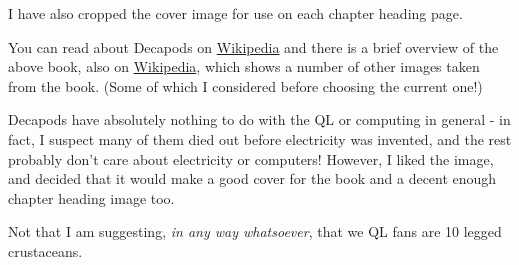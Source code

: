 \documentclass[11pt,fleqn]{book} %
\begin{document}
I have also cropped the cover image for use on each chapter heading page.

You can read about Decapods on \href{https://en.wikipedia.org/wiki/Decapoda}{Wikipedia} and there is a brief overview of the above book, also on \href{https://en.wikipedia.org/wiki/Kunstformen_der_Natur}{Wikipedia},
which shows a number of other images taken from the book. (Some of which I considered before choosing the current one!)

Decapods have absolutely nothing to do with the QL or computing in general - in fact, I suspect many of them died out before electricity was invented, and the rest probably don't care about electricity or computers! However, I liked the image, and decided that it would make a good cover for the book and a decent enough chapter heading image too.

Not that I am suggesting, \emph{in any way whatsoever}, that we QL fans are 10 legged crustaceans.



%
%
%
%
%


\end{document}
